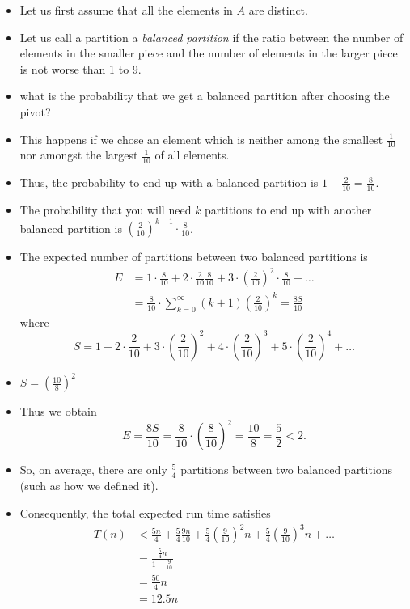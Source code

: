 \documentclass[12pt, letterpaper]{article}
\begin{document}
\begin{itemize}
    \item Let us first assume that all the elements in $A$ are distinct.
    \item Let us call a partition a \textit{balanced partition} if the ratio between the number of elements in the smaller piece and the number of elements in the larger piece is not worse than 1 to 9.
    \item what is the probability that we get a balanced partition after choosing the pivot?
    \item This happens if we chose an element which is neither among the smallest $\frac{1}{10}$ nor amongst the largest $\frac{1}{10}$ of all elements.
    \item Thus, the probability to end up with a balanced partition is $1 - \frac{2}{10} = \frac{8}{10}$.
    \item The probability that you will need $k$ partitions to end up with another balanced partition is $(\frac{2}{10})^{k - 1} \cdot \frac{8}{10}$.
    \item The expected number of partitions between two balanced partitions is \begin{align*}
        E &= 1\cdot \frac{8}{10} + 2 \cdot \frac{2}{10}\frac{8}{10} + 3 \cdot (\frac{2}{10})^2 \cdot \frac{8}{10} + \dots\\
        &= \frac{8}{10}\cdot \sum_{k = 0}^{\infty}(k + 1)(\frac{2}{10})^k = \frac{8S}{10}
    \end{align*} where
    \begin{equation*}
        S = 1 + 2 \cdot \frac{2}{10} + 3 \cdot (\frac{2}{10})^2 + 4 \cdot (\frac{2}{10})^3 + 5\cdot (\frac{2}{10})^4 + \dots
    \end{equation*}
    \item $S = (\frac{10}{8})^2$
    \item Thus we obtain \begin{equation*}
        E = \frac{8S}{10} = \frac{8}{10} \cdot (\frac{8}{10})^2 = \frac{10}{8} = \frac{5}{2} < 2.
    \end{equation*}
    \item So, on average, there are only $\frac{5}{4}$ partitions between two balanced partitions (such as how we defined it).
    \item Consequently, the total expected run time satisfies \begin{align*}
        T(n) &< \frac{5n}{4} + \frac{5}{4}\frac{9n}{10} + \frac{5}{4}(\frac{9}{10})^2n + \frac{5}{4}(\frac{9}{10})^3n + \dots\\
        &= \frac{\frac{5}{4}n}{1 - \frac{9}{10}}\\
        &= \frac{50}{4}n\\
        &= 12.5n
    \end{align*}
\end{itemize}
\end{document}
